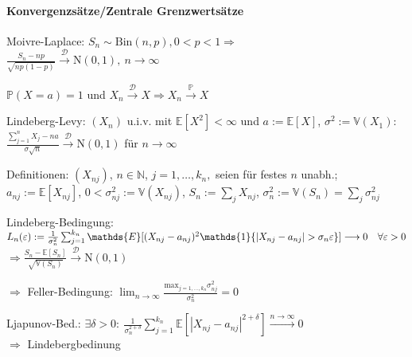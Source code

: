 \documentclass[a4paper,draft]{article}
\newcommand{\N}{\mathds{N}}
\newcommand{\one}{\mathds{1}}
\renewcommand{\P}{\mathds{P}}
\newcommand{\E}[1]{\mathds{E}[#1]}
\newcommand{\D}{\mathcal{D}}
\newcommand{\V}{\mathds{V}}
\newcommand{\parh}{\par\hangindent=0.5cm}
\newcommand{\konv}[1]{\overset{#1}{\longrightarrow}}
\newcommand{\pkonv}{\konv{\P}}
\newcommand{\dkonv}{\konv{\D}}
\begin{document}
\begin{multicols}{2}
\paragraph{Konvergenzsätze/Zentrale Grenzwertsätze}\hspace{0pt}\parh
Moivre-Laplace: $S_n\sim\mathrm{Bin}(n,p),0<p<1\Longrightarrow$\\
$\frac{S_n-np}{\sqrt{np(1-p)}}\dkonv\mathrm{N}(0,1),\:n\longrightarrow\infty$\parh
$\P(X=a)=1$ und $X_n\dkonv X \Longrightarrow X_n\pkonv X$\parh
Lindeberg-Levy: $(X_n)$ u.i.v. mit $\E{X^2}<\infty$ und $a:=\E{X}$, $\sigma^2:=\V(X_1)$:\\
$\frac{\sum_{j=1}^nX_j -na}{\sigma\sqrt{n}} \dkonv \mathrm{N}(0,1)$ für $n \longrightarrow \infty$\parh
Definitionen: $(X_{nj})$, $n\in \N$, $j=1,\hdots,k_n,$ seien für festes $n$ unabh.; $a_{nj}:=\E{X_{nj}}$, $0<\sigma_{nj}^2:=\V(X_{nj})$, $S_n:=\sum_j X_{nj}$, $\sigma_n^2:=\V(S_n)=\sum_j \sigma_{nj}^2$\parh
Lindeberg-Bedingung:\\
$L_n(\varepsilon):=\frac{1}{\sigma_n^2}\sum_{j=1}^{k_n} \E{(X_{nj}-a_{nj})^2 \one\{|X_{nj}-a_{nj}|>\sigma_n\varepsilon\}}\\
\longrightarrow 0 \quad \forall \varepsilon >0$ $\Longrightarrow \frac{S_n-\E{S_n}}{\sqrt{\V(S_n)}}\dkonv \mathrm{N}(0,1)$\parh
$\Longrightarrow$ Feller-Bedingung: $\displaystyle\lim_{n\to\infty}\frac{\mathrm{max}_{j=1,\dots,k_n}\sigma_{nj}^2}{\sigma_n^2}=0$\parh
Ljapunov-Bed.: $\exists \delta>0:\: \frac{1}{\sigma_n^{2+\delta}}\sum_{j=1}^{k_n}\E{|X_{nj}-a_{nj}|^{2+\delta}}\konv{n\to\infty}0$\\
$\Longrightarrow$ Lindebergbedinung


\end{multicols}
\end{document}
